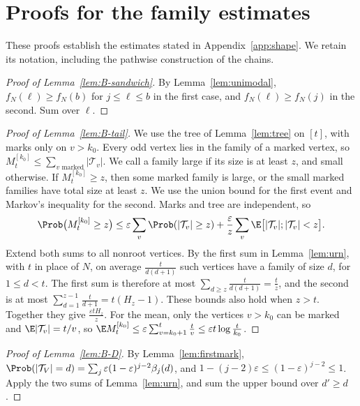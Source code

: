 \section{Proofs for the family estimates}\label{app:families}

These proofs establish the estimates stated in Appendix~\ref{app:shape}.
We retain its notation, including the pathwise construction of the chains.

\begin{proof}[Proof of Lemma~\ref{lem:B-sandwich}]
By Lemma~\ref{lem:unimodal}, $f_N(\ell)\ge f_N(b)$ for $j\le\ell\le b$ in the
first case, and $f_N(\ell)\ge f_N(j)$ in the second. Sum over $\ell$.
\end{proof}

\begin{proof}[Proof of Lemma~\ref{lem:B-tail}]
We use the tree of Lemma~\ref{lem:tree} on $[t]$, with marks only on $v>k_0$.
Every odd vertex lies in the family of a marked vertex, so
$M^{[k_0]}_t\le\sum_{v\text{ marked}}\lvert\mathcal T_v\rvert$. We call a
family large if its size is at least $z$, and small otherwise. If
$M^{[k_0]}_t\ge z$, then some marked family is large, or the small marked
families have total size at least $z$. We use the union bound for the first
event and Markov's inequality for the second. Marks and tree are
independent, so
\[
 \Prob\bigl(M^{[k_0]}_t\ge z\bigr)\le\varepsilon\sum_v\Prob(\lvert\mathcal T_v\rvert\ge z)
 +\frac\varepsilon z\sum_v\E\bigl[\lvert\mathcal T_v\rvert;\lvert\mathcal T_v\rvert<z\bigr].
\]
Extend both sums to all nonroot vertices. By the first sum in
Lemma~\ref{lem:urn}, with $t$ in place of $N$, on average
$\frac t{d(d+1)}$ such vertices have a family of size $d$, for $1\le d<t$.
The first sum is therefore at most
$\sum_{d\ge z}\frac t{d(d+1)}=\frac tz$, and the second is at most
$\sum_{d=1}^{z-1}\frac t{d+1}=t(H_z-1)$. These bounds also hold when $z>t$.
Together they give
$\frac{\varepsilon tH_z}z$. For the mean, only the vertices $v>k_0$ can be
marked and $\E\lvert\mathcal T_v\rvert=t/v$, so $\E
M^{[k_0]}_t\le\varepsilon\sum_{v=k_0+1}^t\frac tv\le\varepsilon t\log\frac
t{k_0}$.
\end{proof}

\begin{proof}[Proof of Lemma~\ref{lem:B-D}]
By Lemma~\ref{lem:firstmark},
$\Prob(\lvert\mathcal T_V\rvert=d)=\sum_j\varepsilon(1-\varepsilon)^{j-2}\beta_j(d)$, and
$1-(j-2)\varepsilon\le(1-\varepsilon)^{j-2}\le1$. Apply the two sums of
Lemma~\ref{lem:urn}, and sum the upper bound over $d'\ge d$.
\end{proof}

